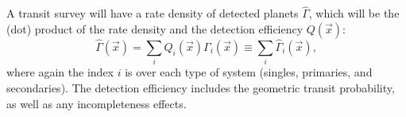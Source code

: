 A transit survey will have a rate density of detected planets $\hat{\Gamma}$, 
which will be the (dot) product of the rate density and the detection 
efficiency $Q(\vec{x})$:
\begin{equation}
\hat{\Gamma}(\vec{x}) = \sum_i Q_i(\vec{x}) \Gamma_i(\vec{x}) 
\equiv \sum_i \hat{\Gamma}_i(\vec{x}),
\label{eq:detected_rate_density}
\end{equation}
where again the index $i$ is over each type of system (singles, primaries, 
and secondaries).
The detection efficiency includes the geometric transit probability, as well 
as any incompleteness effects.
